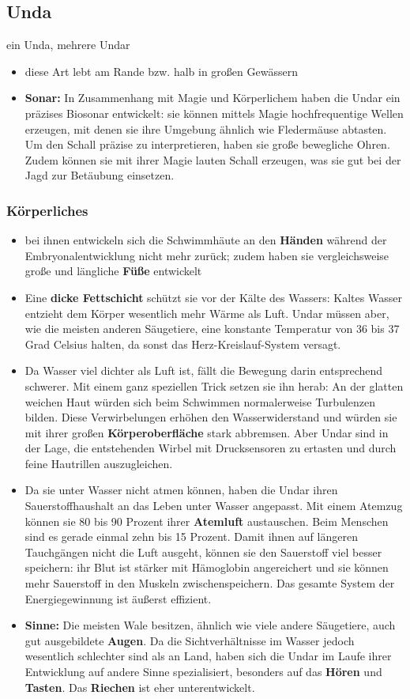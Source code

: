\subsection{Unda}
ein Unda, mehrere Undar
\begin{itemize}
	\item diese Art lebt am Rande bzw. halb in großen Gewässern
	\item \textbf{Sonar:} In Zusammenhang mit Magie und Körperlichem haben die Undar ein präzises Biosonar entwickelt: sie können mittels Magie hochfrequentige Wellen erzeugen, mit denen sie ihre Umgebung ähnlich wie Fledermäuse abtasten. Um den Schall präzise zu interpretieren, haben sie große bewegliche Ohren. Zudem können sie mit ihrer Magie lauten Schall erzeugen, was sie gut bei der Jagd zur Betäubung einsetzen. 
\end{itemize}

\subsubsection{Körperliches}
\begin{itemize}
	\item bei ihnen entwickeln sich die Schwimmhäute an den \textbf{Händen} während der Embryonalentwicklung nicht mehr zurück; zudem haben sie vergleichsweise große und längliche \textbf{Füße} entwickelt
	\item Eine \textbf{dicke Fettschicht} schützt sie vor der Kälte des Wassers: Kaltes Wasser entzieht dem Körper wesentlich mehr Wärme als Luft. Undar müssen aber, wie die meisten anderen Säugetiere, eine konstante Temperatur von 36 bis 37 Grad Celsius halten, da sonst das Herz-Kreislauf-System versagt.
	\item Da Wasser viel dichter als Luft ist, fällt die Bewegung darin entsprechend schwerer. Mit einem ganz speziellen Trick setzen sie ihn herab: An der glatten weichen Haut würden sich beim Schwimmen normalerweise Turbulenzen bilden. Diese Verwirbelungen erhöhen den Wasserwiderstand und würden sie mit ihrer großen \textbf{Körperoberfläche} stark abbremsen. Aber Undar sind in der Lage, die entstehenden Wirbel mit Drucksensoren zu ertasten und durch feine Hautrillen auszugleichen.
	\item Da sie unter Wasser nicht atmen können, haben die Undar ihren Sauerstoffhaushalt an das Leben unter Wasser angepasst. Mit einem Atemzug können sie 80 bis 90 Prozent ihrer \textbf{Atemluft} austauschen. Beim Menschen sind es gerade einmal zehn bis 15 Prozent. Damit ihnen auf längeren Tauchgängen nicht die Luft ausgeht, können sie den Sauerstoff viel besser speichern: ihr Blut ist stärker mit Hämoglobin angereichert und sie können mehr Sauerstoff in den Muskeln zwischenspeichern. Das gesamte System der Energiegewinnung ist äußerst effizient.
	\item \textbf{Sinne:} Die meisten Wale besitzen, ähnlich wie viele andere Säugetiere, auch gut ausgebildete \textbf{Augen}. Da die Sichtverhältnisse im Wasser jedoch wesentlich schlechter sind als an Land, haben sich die Undar im Laufe ihrer Entwicklung auf andere Sinne spezialisiert, besonders auf das \textbf{Hören} und \textbf{Tasten}. Das \textbf{Riechen} ist eher unterentwickelt.
\end{itemize}

